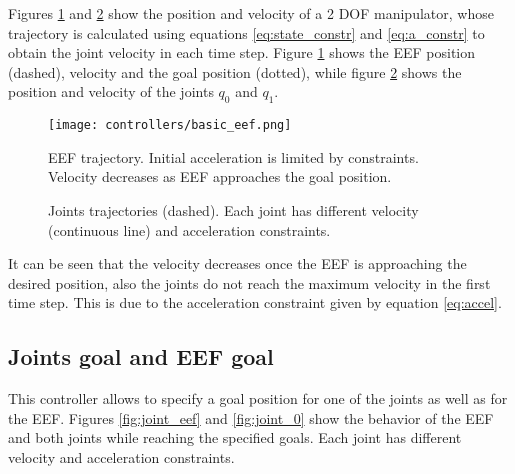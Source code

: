 Figures \ref{fig:basic_eef} and \ref{fig:basic} show the position and velocity of a 2 DOF manipulator, whose trajectory is calculated using equations \ref{eq:state_constr} and \ref{eq:a_constr} to obtain the joint velocity in each time step. Figure \ref{fig:basic_eef}  shows the EEF position (dashed), velocity and the goal position (dotted), while figure \ref{fig:basic} shows the position and velocity of the joints $q_{0}$ and $q_{1}$.

\begin{figure}[H]
	\centering
	\texttt{[image: controllers/basic\_eef.png]}
	\vspace{-10pt}
	\caption[Basic 2 DOF controller: EEF trajectory.] {EEF trajectory. Initial acceleration is limited by constraints. Velocity decreases as EEF approaches the goal position.}
	\vspace{-15pt}
	\label{fig:basic_eef}
\end{figure}
\begin{figure}[H]
	\centering
	\begin{subfigure}[][Joint $q_{0}$]
		{\texttt{[image: controllers/basic\_0.png]}}
	\end{subfigure}
	\begin{subfigure}[][Joint $q_{1}$]
		{\texttt{[image: controllers/basic\_1.png]}}
	\end{subfigure}
	\vspace{-12pt}
	\caption[Basic 2 DOF controller: Joints trajectories]{Joints trajectories (dashed). Each joint has different velocity (continuous line) and acceleration constraints.}
	\vspace{-10pt}
	\label{fig:basic}
\end{figure}
It can be seen that the velocity decreases once the EEF is approaching the desired position, also the joints do not reach the maximum velocity in the first time step. This is due to the acceleration constraint given by equation \ref{eq:accel}.

\subsection{Joints goal and EEF goal}
This controller allows to specify a goal position for one of the joints as well as for the EEF. Figures \ref{fig:joint_eef} and \ref{fig:joint_0} show the behavior of the EEF and both joints while reaching the specified goals. Each joint has different velocity and acceleration constraints.

